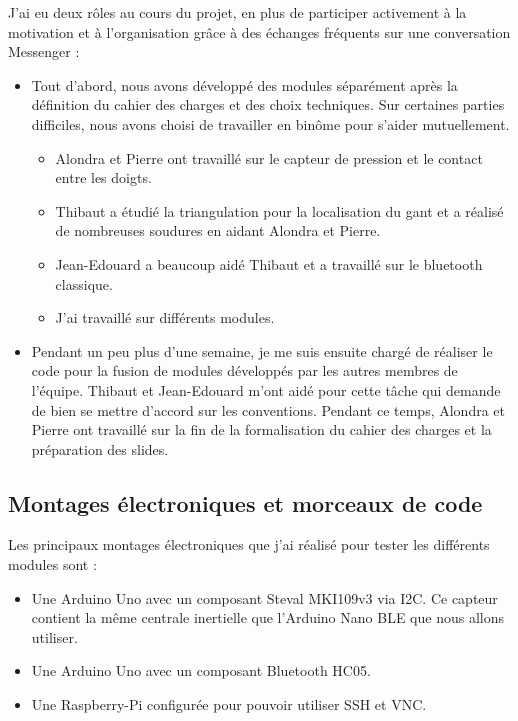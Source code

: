 \documentclass{article}
\begin{document}
        J'ai eu deux rôles au cours du projet, en plus de participer activement à la motivation et à l'organisation grâce à des 
            échanges fréquents sur une conversation Messenger :
            \begin{itemize}
                \item Tout d'abord, nous avons développé des modules séparément après la définition du cahier des charges et des choix techniques.
                        Sur certaines parties difficiles, nous avons choisi de travailler en binôme pour s'aider mutuellement.
                        \begin{itemize}
                            \item Alondra et Pierre ont travaillé sur le capteur de pression et le contact entre les doigts.
                            \item Thibaut a étudié la triangulation pour la localisation du gant et a réalisé de nombreuses soudures
                                    en aidant Alondra et Pierre.
                            \item Jean-Edouard a beaucoup aidé Thibaut et a travaillé sur le bluetooth classique.
                            \item J'ai travaillé sur différents modules.
                        \end{itemize} 
                \item Pendant un peu plus d'une semaine, je me suis ensuite chargé de réaliser le code pour la fusion de modules développés par les autres membres de l'équipe.
                        Thibaut et Jean-Edouard m'ont aidé pour cette tâche qui demande de bien se mettre d'accord sur les conventions.
                        Pendant ce temps, Alondra et Pierre ont travaillé sur la fin de la formalisation du cahier des charges
                            et la préparation des slides.
            \end{itemize}
               
        \subsection{Montages électroniques et morceaux de code}

            Les principaux montages électroniques que j'ai réalisé pour tester les différents modules sont :

            \begin{itemize}
                \item Une Arduino Uno avec un composant Steval MKI109v3 via I2C.
                    Ce capteur contient la même centrale inertielle que l'Arduino Nano BLE que nous allons utiliser.
                \item Une Arduino Uno avec un composant Bluetooth HC05.
                \item Une Raspberry-Pi configurée pour pouvoir utiliser SSH et VNC.
            \end{itemize}
\end{document}
